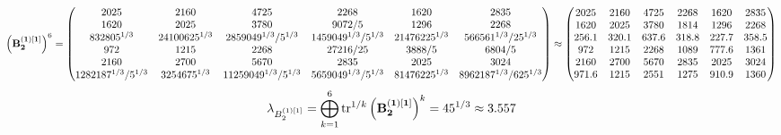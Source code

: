 \documentclass[10pt,a4paper]{article}
\begin{document}
	\[
		\left(\bold{B_2^{(1)[1]}}\right)^{6} = 
		\begin{pmatrix}
			{{2025}}{} & {{2160}}{} & {{4725}}{} & {{2268}}{} & {{1620}}{} & {{2835}}{} \\
			{{1620}}{} & {{2025}}{} & {{3780}}{} & {{9072}} / {{5}} & {{1296}}{} & {{2268}}{} \\
			{{8}{32805^ {1 / 3}}}{} & {{2}{4100625^ {1 / 3}}}{} & {{28}{59049^ {1 / 3}}} / {{5^ {1 / 3}}} & {{14}{59049^ {1 / 3}}} / {{5^ {1 / 3}}} & {{2}{1476225^ {1 / 3}}}{} & {{56}{6561^ {1 / 3}}} / {{25^ {1 / 3}}} \\
			{{972}}{} & {{1215}}{} & {{2268}}{} & {{27216}} / {{25}} & {{3888}} / {{5}} & {{6804}} / {{5}} \\
			{{2160}}{} & {{2700}}{} & {{5670}}{} & {{2835}}{} & {{2025}}{} & {{3024}}{} \\
			{{128}{2187^ {1 / 3}}} / {{5^ {1 / 3}}} & {{32}{54675^ {1 / 3}}}{} & {{112}{59049^ {1 / 3}}} / {{5^ {1 / 3}}} & {{56}{59049^ {1 / 3}}} / {{5^ {1 / 3}}} & {{8}{1476225^ {1 / 3}}}{} & {{896}{2187^ {1 / 3}}} / {{625^ {1 / 3}}} \\
		\end{pmatrix}
		\approx
		\begin{pmatrix}
			2025     & 2160     & 4725     & 2268     & 1620     & 2835     \\
			1620     & 2025     & 3780     & 1814     & 1296     & 2268     \\
			256.1    & 320.1    & 637.6    & 318.8    & 227.7    & 358.5    \\
			972      & 1215     & 2268     & 1089     & 777.6    & 1361     \\
			2160     & 2700     & 5670     & 2835     & 2025     & 3024     \\
			971.6    & 1215     & 2551     & 1275     & 910.9    & 1360     \\
		\end{pmatrix}
	\]
	\[
		\lambda_{B_2^{(1)[1]}} =  \bigoplus ^{6} _{k = 1} \operatorname{tr} ^{1 / k} \left( \bold{B_2^{(1)[1]}} \right)^k = {{45^ {1 / 3}}}{}\approx 3.557
	\]
\end{document}
